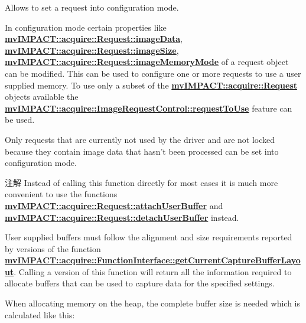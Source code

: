 Allows to set a request into configuration mode. 

In configuration mode certain properties like {\bfseries \hyperlink{classmv_i_m_p_a_c_t_1_1acquire_1_1_request_ad676c45f908bb41df04b15a85bf1f6fd}{mv\+I\+M\+P\+A\+C\+T\+::acquire\+::\+Request\+::image\+Data}}, {\bfseries \hyperlink{classmv_i_m_p_a_c_t_1_1acquire_1_1_request_ac568c457aa474e73066bcc369a26cca1}{mv\+I\+M\+P\+A\+C\+T\+::acquire\+::\+Request\+::image\+Size}}, {\bfseries \hyperlink{classmv_i_m_p_a_c_t_1_1acquire_1_1_request_a05c7f2aad294449e1a9f6eb4a13597d4}{mv\+I\+M\+P\+A\+C\+T\+::acquire\+::\+Request\+::image\+Memory\+Mode}} of a request object can be modified. This can be used to configure one or more requests to use a user supplied memory. To use only a subset of the {\bfseries \hyperlink{classmv_i_m_p_a_c_t_1_1acquire_1_1_request}{mv\+I\+M\+P\+A\+C\+T\+::acquire\+::\+Request}} objects available the {\bfseries \hyperlink{classmv_i_m_p_a_c_t_1_1acquire_1_1_image_request_control_acb01d358421ecad7b28f3de692c4868d}{mv\+I\+M\+P\+A\+C\+T\+::acquire\+::\+Image\+Request\+Control\+::request\+To\+Use}} feature can be used.

Only requests that are currently not used by the driver and are not locked because they contain image data that hasn't been processed can be set into configuration mode.

\begin{DoxyNote}{注解}
Instead of calling this function directly for most cases it is much more convenient to use the functions {\bfseries \hyperlink{classmv_i_m_p_a_c_t_1_1acquire_1_1_request_acd8f58a136dafcb2bae251da383e2b18}{mv\+I\+M\+P\+A\+C\+T\+::acquire\+::\+Request\+::attach\+User\+Buffer}} and {\bfseries \hyperlink{classmv_i_m_p_a_c_t_1_1acquire_1_1_request_a154f54b267a1d9860d1206b2138ef8d0}{mv\+I\+M\+P\+A\+C\+T\+::acquire\+::\+Request\+::detach\+User\+Buffer}} instead.
\end{DoxyNote}
User supplied buffers must follow the alignment and size requirements reported by versions of the function {\bfseries \hyperlink{classmv_i_m_p_a_c_t_1_1acquire_1_1_function_interface_a45d71bedd05998dd9839e1fddc219d5a}{mv\+I\+M\+P\+A\+C\+T\+::acquire\+::\+Function\+Interface\+::get\+Current\+Capture\+Buffer\+Layout}}. Calling a version of this function will return all the information required to allocate buffers that can be used to capture data for the specified settings.

When allocating memory on the heap, the complete buffer size is needed which is calculated like this\+:

